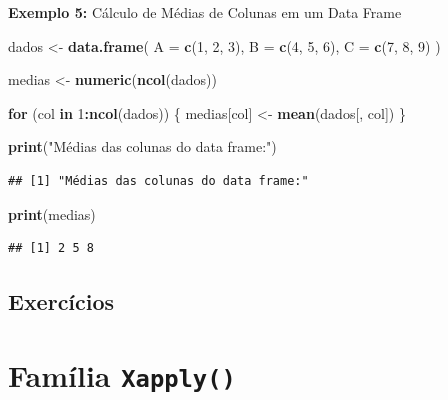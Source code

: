 \documentclass[
]{book}
\newenvironment{Shaded}{\begin{snugshade}}{\end{snugshade}}
\newcommand{\AttributeTok}[1]{\textcolor[rgb]{0.13,0.29,0.53}{#1}}
\newcommand{\ControlFlowTok}[1]{\textcolor[rgb]{0.13,0.29,0.53}{\textbf{#1}}}
\newcommand{\DecValTok}[1]{\textcolor[rgb]{0.00,0.00,0.81}{#1}}
\newcommand{\FunctionTok}[1]{\textcolor[rgb]{0.13,0.29,0.53}{\textbf{#1}}}
\newcommand{\NormalTok}[1]{#1}
\newcommand{\OtherTok}[1]{\textcolor[rgb]{0.56,0.35,0.01}{#1}}
\newcommand{\SpecialCharTok}[1]{\textcolor[rgb]{0.81,0.36,0.00}{\textbf{#1}}}
\newcommand{\StringTok}[1]{\textcolor[rgb]{0.31,0.60,0.02}{#1}}
\begin{document}
\textbf{Exemplo 5:} Cálculo de Médias de Colunas em um Data Frame

\begin{Shaded}
\begin{Highlighting}[]
\NormalTok{dados }\OtherTok{\textless{}{-}} \FunctionTok{data.frame}\NormalTok{(}
\AttributeTok{A =} \FunctionTok{c}\NormalTok{(}\DecValTok{1}\NormalTok{, }\DecValTok{2}\NormalTok{, }\DecValTok{3}\NormalTok{),}
\AttributeTok{B =} \FunctionTok{c}\NormalTok{(}\DecValTok{4}\NormalTok{, }\DecValTok{5}\NormalTok{, }\DecValTok{6}\NormalTok{),}
\AttributeTok{C =} \FunctionTok{c}\NormalTok{(}\DecValTok{7}\NormalTok{, }\DecValTok{8}\NormalTok{, }\DecValTok{9}\NormalTok{)}
\NormalTok{)}

\NormalTok{medias }\OtherTok{\textless{}{-}} \FunctionTok{numeric}\NormalTok{(}\FunctionTok{ncol}\NormalTok{(dados))}

\ControlFlowTok{for}\NormalTok{ (col }\ControlFlowTok{in} \DecValTok{1}\SpecialCharTok{:}\FunctionTok{ncol}\NormalTok{(dados)) \{}
\NormalTok{  medias[col] }\OtherTok{\textless{}{-}} \FunctionTok{mean}\NormalTok{(dados[, col])}
\NormalTok{\}}

\FunctionTok{print}\NormalTok{(}\StringTok{"Médias das colunas do data frame:"}\NormalTok{)}
\end{Highlighting}
\end{Shaded}

\begin{verbatim}
## [1] "Médias das colunas do data frame:"
\end{verbatim}

\begin{Shaded}
\begin{Highlighting}[]
\FunctionTok{print}\NormalTok{(medias)}
\end{Highlighting}
\end{Shaded}

\begin{verbatim}
## [1] 2 5 8
\end{verbatim}

\section{Exercícios}\label{exercuxedcios-8}

\chapter{\texorpdfstring{Família \texttt{Xapply()}}{Família Xapply()}}\label{famuxedlia-xapply}
\end{document}
